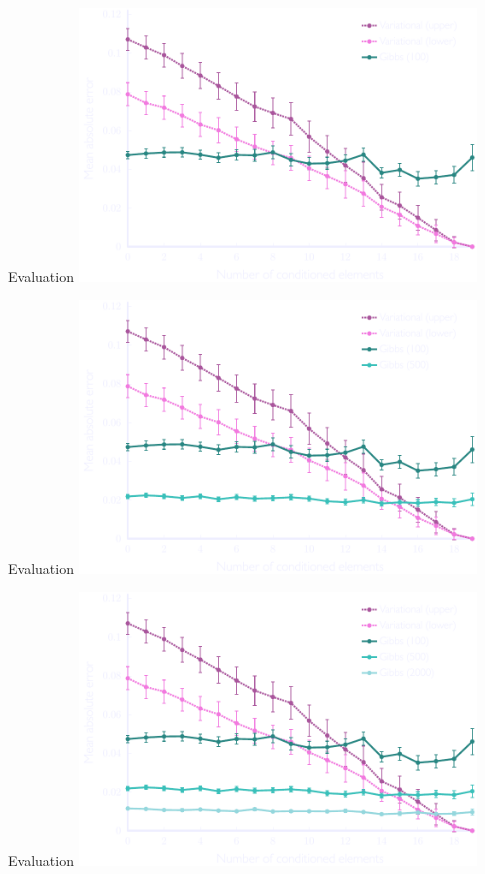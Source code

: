 \documentclass[mathserif]{beamer}
\begin{document}
\begin{frame}{Evaluation}
\vspace{1em}
\centering
\includegraphics[width=4.15in,trim=6 0 0 0,clip]{figures/floc_3.pdf}
\end{frame}

\begin{frame}{Evaluation}
\vspace{1em}
\centering
\includegraphics[width=4.15in,trim=6 0 0 0,clip]{figures/floc_4.pdf}
\end{frame}

\begin{frame}{Evaluation}
\vspace{1em}
\centering
\includegraphics[width=4.15in,trim=6 0 0 0,clip]{figures/floc_5.pdf}
\end{frame}
\end{document}
